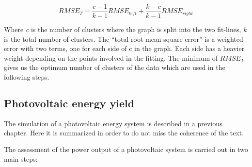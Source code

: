 \begin{itemize}
\begin{equation}\label{eq:total_RMSE}
  RMSE_T = \frac{c-1}{k-1}RMSE_{left}+\frac{k-c}{k-1}RMSE_{right}
\end{equation}



Where \textit{c} is the number of clusters where the graph is split into the two fit-lines, \textit{k} is the total number of clusters. The ``total root mean square error'' is a weighted error with two terms, one for each side of c in the graph. Each side has a heavier weight depending on the points involved in the fitting. The minimum of $RMSE_{T}$ gives us the optimum number of clusters of the data \cite*{Zagouras2013} which are used in the following steps.
 
\end{itemize}
 
\subsection{Photovoltaic energy yield}

The simulation of a photovoltaic energy system is described in a previous chapter. Here it is summarized in order to do not miss the coherence of the text.

The assessment of the power output of a photovoltaic system is carried out in two main steps:

